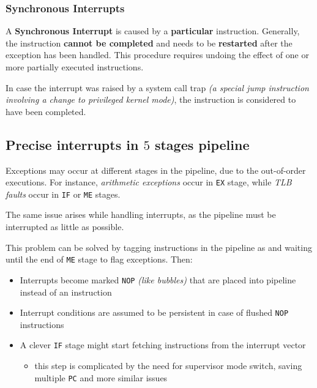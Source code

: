 \documentclass[english]{article}
\begin{document}
\subsubsection{Synchronous Interrupts}

A \textbf{Synchronous Interrupt} is caused by a \textbf{particular} instruction.
Generally, the instruction \textbf{cannot be completed} and needs to be \textbf{restarted} after the exception has been handled.
This procedure requires undoing the effect of one or more partially executed instructions.

In case the interrupt was raised by a system call trap \textit{(a special jump instruction involving a change to privileged kernel mode)}, the instruction is considered to have been completed.

\subsection[Precise interrupts in 5 stages pipeline]{Precise interrupts in \(5\) stages pipeline}

Exceptions may occur at different stages in the pipeline, due to the out-of-order executions.
For instance, \textit{arithmetic exceptions} occur in \texttt{EX} stage, while \textit{TLB faults} occur in \texttt{IF} or \texttt{ME} stages.

The same issue arises while handling interrupts, as the pipeline must be interrupted as little as possible.

This problem can be solved by tagging instructions in the pipeline as  and waiting until the end of \texttt{ME} stage to flag exceptions.
Then:

\begin{itemize}
  \item Interrupts become marked \texttt{NOP} \textit{(like bubbles)} that are placed into pipeline instead of an instruction
  \item Interrupt conditions are assumed to be persistent in case of flushed \texttt{NOP} instructions
  \item A clever \texttt{IF} stage might start fetching instructions from the interrupt vector
        \begin{itemize}
          \item this step is complicated by the need for supervisor mode switch, saving multiple \texttt{PC} and more similar issues
        \end{itemize}
\end{itemize}
\end{document}
